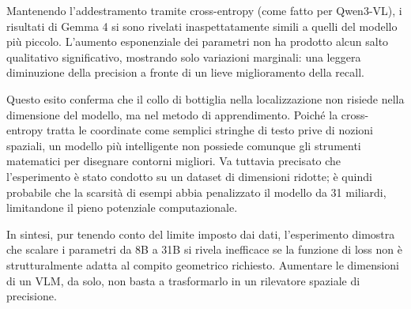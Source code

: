 \noindent
Mantenendo l'addestramento tramite cross-entropy (come fatto per Qwen3-VL), i risultati di Gemma 4 si sono rivelati inaspettatamente simili a quelli del modello più piccolo.
L'aumento esponenziale dei parametri non ha prodotto alcun salto qualitativo significativo, mostrando solo variazioni marginali: una leggera diminuzione della precision a fronte di un lieve miglioramento della recall.

\noindent
Questo esito conferma che il collo di bottiglia nella localizzazione non risiede nella dimensione del modello, ma nel metodo di apprendimento. Poiché la cross-entropy tratta le coordinate come semplici stringhe di testo
prive di nozioni spaziali, un modello più intelligente non possiede comunque gli strumenti matematici per disegnare contorni migliori. Va tuttavia precisato che l'esperimento è stato condotto su un dataset di dimensioni ridotte;
è quindi probabile che la scarsità di esempi abbia penalizzato il modello da 31 miliardi, limitandone il pieno potenziale computazionale.

\noindent
In sintesi, pur tenendo conto del limite imposto dai dati, l'esperimento dimostra che scalare i parametri da 8B a 31B si rivela inefficace se la funzione di loss non è strutturalmente adatta al compito geometrico richiesto.
Aumentare le dimensioni di un VLM, da solo, non basta a trasformarlo in un rilevatore spaziale di precisione.
